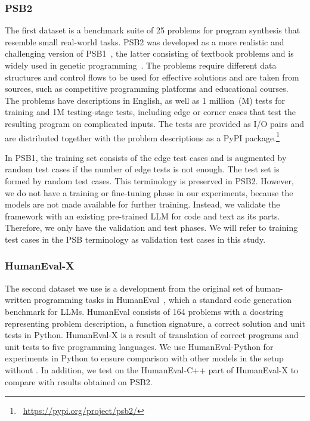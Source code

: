\subsubsection{PSB2}
The first dataset is a benchmark suite of 25 problems for program synthesis that resemble small real-world tasks. PSB2 was developed as a more realistic and challenging version of PSB1~\cite{helmuth2015:general}, the latter consisting of textbook problems and is widely used in genetic programming~\cite{sobania2022:choose}. 
The problems require different data structures and control flows to be used for effective solutions and are taken from sources, such as competitive programming platforms and educational courses. 
The problems have descriptions in English, as well as 1 million~(M) tests for training and 1M testing-stage tests, including edge or corner cases that test the resulting program on complicated inputs. 
The tests are provided as I/O pairs and are distributed together with the problem descriptions as a PyPI package.\footnote{~\url{https://pypi.org/project/psb2/}} 

In PSB1, the training set consists of the edge test cases and is augmented by random test cases if the number of edge tests is not enough. The test set is formed by random test cases. 
This terminology is preserved in PSB2. 
However, we do not have a training or fine-tuning phase in our experiments, because the models are not made available for further training. Instead, we validate the framework with an existing pre-trained LLM for code and text as its parts. 
Therefore, we only have the validation and test phases. 
We will refer to training test cases in the PSB terminology as validation test cases in this study. 

\subsubsection{HumanEval-X}
The second dataset we use is a development from the original set of human-written programming tasks in HumanEval~\cite{chen2021:evaluating}, which a standard code generation benchmark for LLMs.
HumanEval consists of 164 problems with a docstring representing problem description, a function signature, a correct solution and unit tests in Python. 
HumanEval-X is a result of translation of correct programs and unit tests to five programming languages. 
We use HumanEval-Python for experiments in Python to ensure comparison with other models in the setup without \method{}. 
In addition, we test \method{} on the HumanEval-C++ part of HumanEval-X to compare with results obtained on PSB2. %

